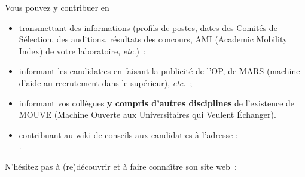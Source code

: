 Vous pouvez y contribuer en
\begin{itemize}
\item transmettant des
informations (profils de postes, dates des Comit\'es de S\'election, des auditions, r\'esultats des
concours, AMI (Academic Mobility Index) de votre laboratoire, {\em
etc.})~;
\item informant les candidat$\cdot$es en faisant la publicit\'e de
l'OP, de MARS (machine d'aide au recrutement dans le sup\'erieur),
{\em etc.}~;
\item informant vos coll\`egues {\bf y compris d'autres
disciplines} de l'existence de MOUVE (Machine Ouverte aux
Universitaires qui Veulent
\'Echanger).
 
\item contribuant au wiki de conseils aux candidat$\cdot$es \`a l'adresse :\\
.
\end{itemize}

N'h\'esitez pas \`a (re)d\'ecouvrir
et \`a faire conna\^\i  tre son site web~:
